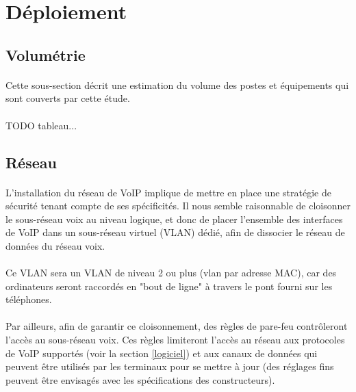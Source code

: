\section{Déploiement}

\subsection{Volumétrie}

\paragraph{} Cette sous-section décrit une estimation du volume des postes et
équipements qui sont couverts par cette étude.

\paragraph{} TODO tableau...

\subsection{Réseau}

\paragraph{} L'installation du réseau de VoIP implique de mettre en place une
stratégie de sécurité tenant compte de ses spécificités. Il nous semble
raisonnable de cloisonner le sous-réseau voix au niveau logique, et donc de
placer l'ensemble des interfaces de VoIP dans un sous-réseau virtuel (VLAN)
dédié, afin de dissocier le réseau de données du réseau voix.

\paragraph{} Ce VLAN sera un VLAN de niveau 2 ou plus (vlan par adresse MAC),
car des ordinateurs seront raccordés en "bout de ligne" à travers le pont fourni
sur les téléphones.

\paragraph{} Par ailleurs, afin de garantir ce cloisonnement, des règles de
pare-feu contrôleront l'accès au sous-réseau voix. Ces règles limiteront
l'accès au réseau aux protocoles de VoIP supportés (voir la section
\ref{logiciel}) et aux canaux de données qui peuvent être utilisés par les
terminaux pour se mettre à jour (des réglages fins peuvent être envisagés avec
les spécifications des constructeurs).

